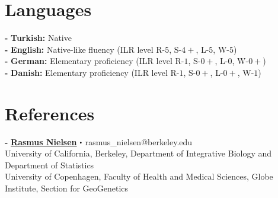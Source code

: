 \documentclass[letterpaper,10.5pt]{article}
\newcommand\sbullet[1][.5]{\mathbin{\vcenter{\hbox{\scalebox{#1}{$\bullet$}}}}}
\begin{document}

 

\section{Languages}
    \textbf{-}  \textbf{Turkish:} Native \\
    \textbf{-}  \textbf{English:} Native-like fluency (ILR level R-$5$, S-$4+$, L-$5$, W-$5$) \\
    \textbf{-}  \textbf{German:} Elementary proficiency (ILR level R-$1$, S-$0+$, L-$0$, W-$0+$) \\
    \textbf{-}  \textbf{Danish:} Elementary proficiency (ILR level R-$1$, S-$0+$, L-$0+$, W-$1$) \\

\section{References}

\textbf{-} \textbf{\href{https://scholar.google.com/citations?user=PySbfcEAAAAJ&hl=en&oi=ao}{Rasmus Nielsen}}  $\sbullet[.5]$ rasmus\_nielsen@berkeley.edu \\
University of California, Berkeley, Department of Integrative Biology and Department of Statistics \\
University of Copenhagen, Faculty of Health and Medical Sciences, Globe Institute, Section for GeoGenetics \\
\end{document}
